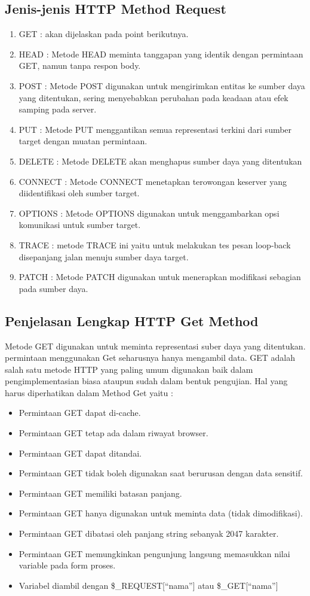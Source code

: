 \subsection{Jenis-jenis HTTP Method Request}
\begin{enumerate}
  \item GET : akan dijelaskan pada point berikutnya.
  \item HEAD : Metode HEAD meminta tanggapan yang identik dengan permintaan GET, namun tanpa respon body.
  \item POST : Metode POST digunakan untuk mengirimkan entitas ke sumber daya yang ditentukan, sering menyebabkan perubahan pada keadaan atau efek samping pada server.
  \item PUT : Metode PUT menggantikan semua representasi terkini dari sumber target dengan muatan permintaan.
  \item DELETE : Metode DELETE akan menghapus sumber daya yang ditentukan
  \item CONNECT : Metode CONNECT menetapkan terowongan keserver yang diidentifikasi oleh sumber target.
  \item OPTIONS : Metode OPTIONS digunakan untuk menggambarkan opsi komunikasi untuk sumber target.
  \item TRACE : metode TRACE ini yaitu untuk melakukan tes pesan loop-back disepanjang jalan menuju sumber daya target.
  \item PATCH : Metode PATCH digunakan untuk menerapkan modifikasi sebagian pada sumber daya.
\end{enumerate}

\subsection{Penjelasan Lengkap HTTP Get Method}
Metode GET digunakan untuk meminta representasi suber daya yang ditentukan. permintaan menggunakan Get seharusnya hanya mengambil data. GET adalah salah satu metode HTTP yang paling umum digunakan baik dalam pengimplementasian biasa ataupun sudah dalam bentuk pengujian. Hal yang harus diperhatikan dalam Method Get yaitu :
\begin{itemize}
  \item Permintaan GET dapat di-cache.
  \item Permintaan GET tetap ada dalam riwayat browser.
  \item Permintaan GET dapat ditandai.
  \item Permintaan GET tidak boleh digunakan saat berurusan dengan data sensitif.
  \item Permintaan GET memiliki batasan panjang.
  \item Permintaan GET hanya digunakan untuk meminta data (tidak dimodifikasi).
  \item Permintaan GET dibatasi oleh panjang string sebanyak 2047 karakter.
  \item Permintaan GET memungkinkan pengunjung langsung memasukkan nilai variable pada form proses.
  \item Variabel diambil dengan \$\_REQUEST[“nama”] atau \$\_GET[“nama”]
\end{itemize}

